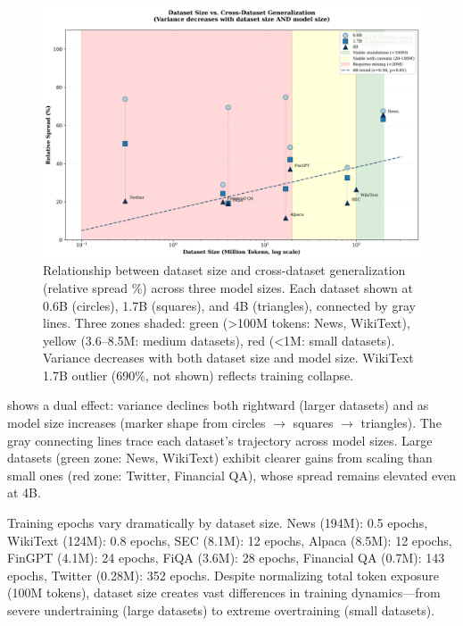 \begin{figure}[htbp]
\centering
\includegraphics[width=\textwidth]{figures/scatter_size_variance.png}
\caption[Dataset Size vs. Generalization Across Model Scales]{Relationship between dataset size and cross-dataset generalization (relative spread \%) across three model sizes. Each dataset shown at 0.6B (circles), 1.7B (squares), and 4B (triangles), connected by gray lines. Three zones shaded: green (>100M tokens: News, WikiText), yellow (3.6–8.5M: medium datasets), red (<1M: small datasets). Variance decreases with both dataset size and model size. WikiText 1.7B outlier (690\%, not shown) reflects training collapse.}
\label{fig:scatter_size_variance}
\end{figure}

 shows a dual effect: variance declines both rightward (larger datasets) and as model size increases (marker shape from circles \(\to\) squares \(\to\) triangles). The gray connecting lines trace each dataset's trajectory across model sizes. Large datasets (green zone: News, WikiText) exhibit clearer gains from scaling than small ones (red zone: Twitter, Financial QA), whose spread remains elevated even at 4B.

Training epochs vary dramatically by dataset size. News (194M): 0.5 epochs, WikiText (124M): 0.8 epochs, SEC (8.1M): 12 epochs, Alpaca (8.5M): 12 epochs, FinGPT (4.1M): 24 epochs, FiQA (3.6M): 28 epochs, Financial QA (0.7M): 143 epochs, Twitter (0.28M): 352 epochs. Despite normalizing total token exposure (100M tokens), dataset size creates vast differences in training dynamics—from severe undertraining (large datasets) to extreme overtraining (small datasets).

